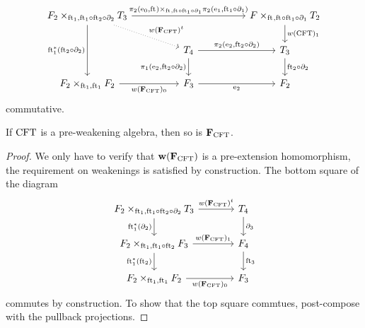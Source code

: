 \begin{defn}
\begin{itemize}
\begin{equation*}
\begin{tikzcd}[column sep=huge]
\pullback{\stesysf_2}{\stesyst_3}{\eft[1]}{\eft[1]\circ\eft[2]\circ\ebd[2]}
  \ar{rr}{\pullback{\pullbackpr{2}{\ectxext}{\eft}}{\pullbackpr{2}{\efamext}{\eft[1]\circ\ebd[1]}}{\eft}{\eft\circ\eft[1]\circ\ebd[1]}}
  \ar[dotted]{dr}{w(\famesys{\stesys})^t}
  \ar{dd}[swap]{\eft[1]^\ast(\eft[2]\circ\ebd[2])}
  & &
\pullback{\stesysf}{\stesyst_2}{\eft}{\eft\circ\eft[1]\circ\ebd[1]}
  \ar{d}{w(\stesys)_1}
  \\
  {}&
\stesyst_4
  \ar{r}{\pullbackpr{2}{\eext{2}}{\eft[2]\circ\ebd[2]}}
  \ar{d}[swap]{\pullbackpr{1}{\eext{2}}{\eft[2]\circ\ebd[2]}}
  &
\stesyst_3
  \ar{d}{\eft[2]\circ\ebd[2]}
  \\
\pullback{\stesysf_2}{\stesysf_2}{\eft[1]}{\eft[1]}
  \ar{r}[swap]{w(\famesys{\stesys})_0}
  &
\stesysf_3
  \ar{r}[swap]{\eext{2}}
  &
\stesysf_2
\end{tikzcd}
\end{equation*}
commutative.
\end{itemize}
\end{defn}

\begin{lem}
If $\mathrm{CFT}$ is a pre-weakening algebra, then so is $\mathbf{F}_{\mathrm{CFT}}$. 
\end{lem}

\begin{proof}
We only have to verify that $\mathbf{w}(\mathbf{F}_{\mathrm{CFT}})$ is a pre-extension
homomorphism, the requirement on weakenings is satisfied by construction.
The bottom square of the diagram
\begin{equation*}
\begin{tikzcd}[column sep=large]
\pullback{\stesysf_2}{\stesyst_3}{\eft[1]}{\eft[1]\circ\eft[2]\circ\ebd[2]}
  \ar{r}{w(\famesys{\stesys})^t}
  \ar{d}[swap]{\eft[1]^\ast(\ebd[2])}
  &
\stesyst_4
  \ar{d}{\ebd[3]}
  \\
\pullback{\stesysf_2}{\stesysf_3}{\eft[1]}{\eft[1]\circ\eft[2]}
  \ar{r}{w(\famesys{\stesys})_1}
  \ar{d}[swap]{\eft[1]^\ast(\eft[2])}
  &
\stesysf_4
  \ar{d}{\eft[3]}
  \\
\pullback{\stesysf_2}{\stesysf_2}{\eft[1]}{\eft[1]}
  \ar{r}[swap]{w(\famesys{\stesys})_0}
  &
\stesysf_3
\end{tikzcd}
\end{equation*}
commutes by construction. To show that the top square commtues, post-compose
with the pullback projections.
\end{proof}

